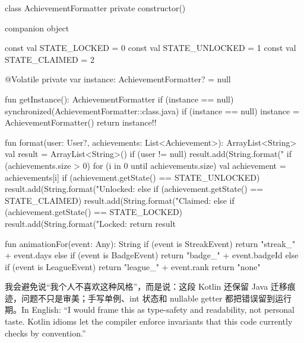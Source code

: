 \begin{ktbug}
class AchievementFormatter private constructor() {
    companion object {
        const val STATE_LOCKED = 0
        const val STATE_UNLOCKED = 1
        const val STATE_CLAIMED = 2

        @Volatile private var instance: AchievementFormatter? = null

        fun getInstance(): AchievementFormatter {
            if (instance == null) {
                synchronized(AchievementFormatter::class.java) {
                    if (instance == null) {
                        instance = AchievementFormatter()
                    }
                }
            }
            return instance!!
        }
    }

    fun format(user: User?, achievements: List<Achievement>): ArrayList<String> {
        val result = ArrayList<String>()
        if (user != null) {
            result.add(String.format("%
        }
        if (achievements.size > 0) {
            for (i in 0 until achievements.size) {
                val achievement = achievements[i]
                if (achievement.getState() == STATE_UNLOCKED) {
                    result.add(String.format("Unlocked: %
                } else if (achievement.getState() == STATE_CLAIMED) {
                    result.add(String.format("Claimed: %
                } else if (achievement.getState() == STATE_LOCKED) {
                    result.add(String.format("Locked: %
                }
            }
        }
        return result
    }

    fun animationFor(event: Any): String {
        if (event is StreakEvent) {
            return "streak_" + event.days
        } else if (event is BadgeEvent) {
            return "badge_" + event.badgeId
        } else if (event is LeagueEvent) {
            return "league_" + event.rank
        }
        return "none"
    }
}
\end{ktbug}

\begin{sayit}[面试里怎么说]
我会避免说“我个人不喜欢这种风格”，而是说：这段 Kotlin 还保留 Java 迁移痕迹，问题不只是审美；手写单例、int 状态和 nullable getter 都把错误留到运行期。In English: ``I would frame this as type-safety and readability, not personal taste. Kotlin idioms let the compiler enforce invariants that this code currently checks by convention.''
\end{sayit}

